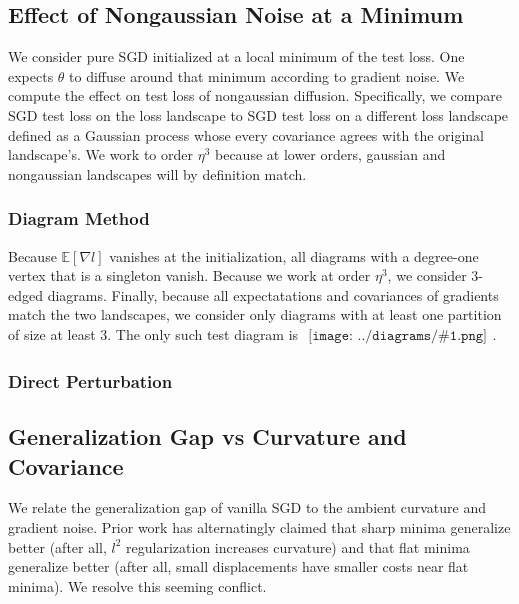 \documentclass{article}
\newcommand{\expct}[1]{\mathbb{E}\left[#1\right]}
\newcommand{\sdia}[1]{\begin{gathered}\texttt{[image: ../diagrams/\#1.png]}\end{gathered}}
\begin{document}
    \subsection*{Effect of Nongaussian Noise at a Minimum}
        We consider pure SGD initialized at a local minimum of the test loss.
        One expects $\theta$ to diffuse around that minimum according to
        gradient noise.  We compute the effect on test loss of nongaussian
        diffusion.  Specifically, we compare SGD test loss on the loss
        landscape to SGD test loss on a different loss landscape defined as a
        Gaussian process whose every covariance agrees with the original
        landscape's.  We work to order $\eta^3$ because at lower orders,
        gaussian and nongaussian landscapes will by definition match. 

        \subsubsection*{Diagram Method}
        Because $\expct{\nabla l}$ vanishes at the initialization, all diagrams
        with a degree-one vertex that is a singleton vanish.  Because we work
        at order $\eta^3$, we consider $3$-edged diagrams.
        Finally, because all expectatations and covariances of gradients
        match the two landscapes, we consider only diagrams with at least one
        partition of size at least $3$.
        The only such test diagram is $\sdia{(012-3)(03-13-23)}$.

        \subsubsection*{Direct Perturbation}


    \subsection*{Generalization Gap vs Curvature and Covariance}
        We relate the generalization gap of vanilla SGD to the ambient curvature
        and gradient noise.  Prior work has alternatingly claimed that sharp
        minima generalize better (after all, $l^2$ regularization increases
        curvature) and that flat minima generalize better (after all, small
        displacements have smaller costs near flat minima). 
        We resolve this seeming conflict.
\end{document}
